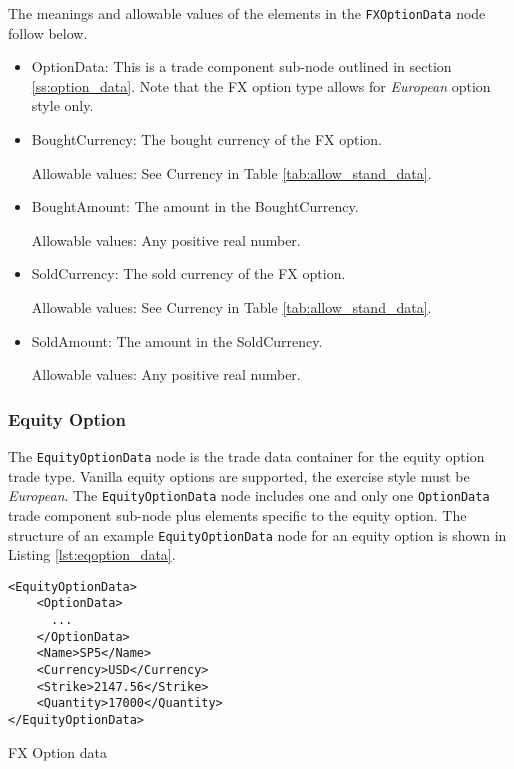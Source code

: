 The meanings and allowable values of the elements in the \lstinline!FXOptionData!  node follow below.

\begin{itemize}
\item OptionData: This is a trade component sub-node outlined in section \ref{ss:option_data}. Note that the
  FX option type allows for \emph{European} option style only.

\item BoughtCurrency: The bought currency of the FX option.  

Allowable values:  See Currency in Table \ref{tab:allow_stand_data}.

\item BoughtAmount: The amount in the BoughtCurrency.  

Allowable values:  Any positive real number.

\item SoldCurrency: The sold currency of the FX option.  

Allowable values:  See Currency in Table \ref{tab:allow_stand_data}.

\item SoldAmount: The amount in the SoldCurrency.  

Allowable values:  Any positive real number.

\end{itemize}

\subsubsection{Equity Option}

The \lstinline!EquityOptionData!  node is the trade data container for the equity option trade type.  Vanilla equity 
options are supported, the exercise style must be \emph{European}. The \lstinline!EquityOptionData!  node includes one and 
only one \lstinline!OptionData! trade component sub-node plus elements specific to the equity option. The structure of 
an example \lstinline!EquityOptionData! node for an equity option is shown in Listing
\ref{lst:eqoption_data}.

\begin{listing}[H]
\begin{verbatim}
<EquityOptionData>
    <OptionData>
      ...
    </OptionData>
    <Name>SP5</Name>
    <Currency>USD</Currency>
    <Strike>2147.56</Strike>
    <Quantity>17000</Quantity>
</EquityOptionData>
\end{verbatim}
\caption{FX Option data}
\label{lst:eqoption_data}
\end{listing}

